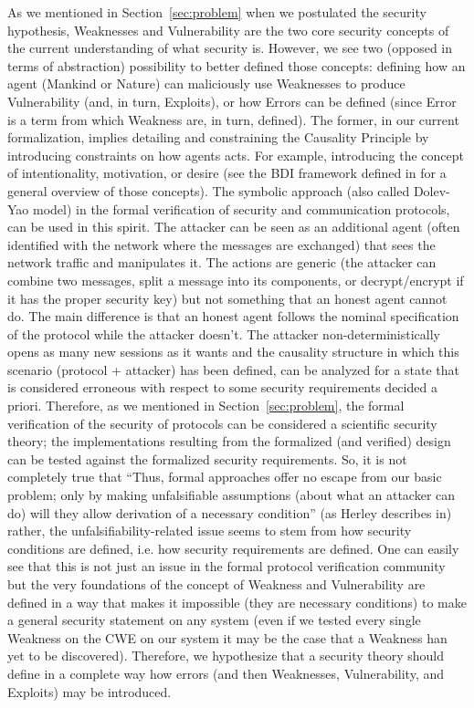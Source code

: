 As we mentioned in Section~\ref{sec:problem} when we postulated the
security hypothesis, Weaknesses and Vulnerability are the two core security
concepts of the current understanding of what security is. However, we see two
(opposed in terms of abstraction) possibility to better defined those concepts:
defining how an agent (Mankind or Nature) can maliciously use Weaknesses to
produce Vulnerability (and, in turn, Exploits), or how Errors can be defined
(since Error is a term from which Weakness are, in turn, defined).  The former,
in our current formalization, implies detailing and constraining the Causality
Principle by introducing constraints on how agents acts. For example,
introducing the concept of intentionality, motivation, or desire (see the BDI
framework defined in \autocite{Rao1995semantics} for a general overview of those concepts).
The symbolic approach (also called Dolev-Yao model) in the formal verification
of security and communication protocols, can be used in this spirit. The
attacker can be seen as an additional agent (often identified with the network
where the messages are exchanged) that sees the network traffic and manipulates
it. The actions are generic (the attacker can combine two messages, split a
message into its components, or decrypt/encrypt if it has the proper security
key) but not something that an honest agent cannot do. The main difference is
that an honest agent follows the nominal specification of the protocol while
the attacker doesn't. The attacker non-deterministically opens as many new
sessions as it wants and the causality structure in which this scenario
(protocol + attacker) has been defined, can be analyzed for a state that is
considered erroneous with respect to some security requirements decided a
priori. Therefore, as we mentioned in Section~\ref{sec:problem}, the
formal verification of the security of protocols can be considered a scientific
security theory; the implementations resulting from the formalized (and
verified) design can be tested against the formalized security requirements.
So, it is not completely true that ``Thus, formal approaches offer no escape
from our basic problem; only by making unfalsifiable assumptions (about what an
attacker can do) will they allow derivation of a necessary condition'' (as
Herley describes in\autocite{Herley2009so}) rather, the
unfalsifiability-related issue seems to stem from how security conditions are
defined, i.e. how security requirements are defined. One can easily see that
this is not just an issue in the formal protocol verification community but the
very foundations of the concept of Weakness and Vulnerability are defined in a
way that makes it impossible (they are necessary conditions) to make a general
security statement on any system (even if we tested every single Weakness on
the CWE on our system it may be the case that a Weakness han yet to be
discovered). Therefore, we hypothesize that a security theory should define in
a complete way how errors (and then Weaknesses, Vulnerability, and Exploits)
may be introduced.

